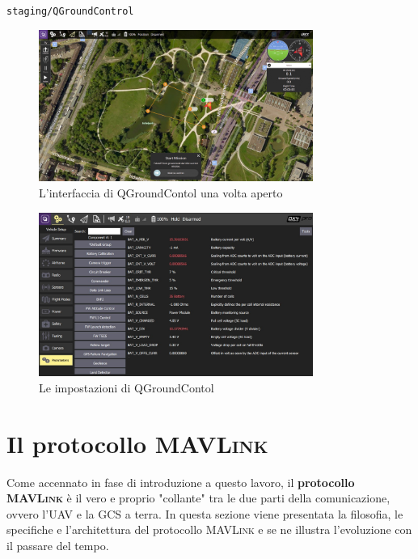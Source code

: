 \documentclass[a4paper, 12pt, oneside]{article}
\theoremstyle{definition}
\begin{document}
\begin{center}
    \texttt{staging/QGroundControl}
\end{center}

\begin{figure}[H]
    \centering
    \includegraphics[width=0.8\textwidth]{images/QGroundCotrol-Interface.jpg}
    \caption{L'interfaccia di QGroundContol una volta aperto}
\end{figure}

\begin{figure}[H]
    \centering
    \includegraphics[width=0.8\textwidth]{images/QGroundControl-settings.jpg}
    \caption{Le impostazioni di QGroundContol}
\end{figure}

\section{Il protocollo \textsc{MAVLink}}

Come accennato in fase di introduzione a questo lavoro, il \textbf{protocollo \textsc{MAVLink}} è il vero e proprio "collante" tra le due parti della comunicazione, ovvero l'UAV e la GCS a terra. In questa sezione viene presentata la filosofia, le specifiche e l'architettura del protocollo \textsc{MAVLink} e se ne illustra l'evoluzione con il passare del tempo.
\end{document}
